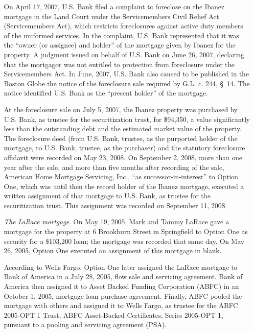 On April 17, 2007, U.S. Bank filed a complaint to foreclose on the Ibanez
mortgage in the Land Court under the Servicemembers Civil Relief Act
(Servicemembers Act), which restricts foreclosures against active duty members
of the uniformed services. In the complaint, U.S. Bank represented that it was
the ``owner (or assignee) and holder'' of the mortgage given by Ibanez for the
property. A judgment issued on behalf of U.S. Bank on June 26, 2007, declaring
that the mortgagor was not entitled to protection from foreclosure under the
Servicemembers Act. In June, 2007, U.S. Bank also caused to be published in the
Boston Globe the notice of the foreclosure sale required by G.L. c. 244, \S~14.
The notice identified U.S. Bank as the ``present holder'' of the mortgage.

At the foreclosure sale on July 5, 2007, the Ibanez property was purchased by
U.S. Bank, as trustee for the securitization trust, for \$94,350, a value
significantly less than the outstanding debt and the estimated market value of
the property. The foreclosure deed (from U.S. Bank, trustee, as the purported
holder of the mortgage, to U.S. Bank, trustee, as the purchaser) and the
statutory foreclosure affidavit were recorded on May 23, 2008. On September 2,
2008, more than one year after the sale, and more than five months after
recording of the sale, American Home Mortgage Servicing, Inc., ``as
successor-in-interest'' to Option One, which was until then the record holder
of the Ibanez mortgage, executed a written assignment of that mortgage to U.S.
Bank, as trustee for the securitization trust. This assignment was recorded on
September 11, 2008.

\textit{The LaRace mortgage}. On May 19, 2005, Mark and Tammy LaRace gave a
mortgage for the property at 6 Brookburn Street in Springfield to Option One as
security for a \$103,200 loan; the mortgage was recorded that same day. On May
26, 2005, Option One executed an assignment of this mortgage in blank.

According to Wells Fargo, Option One later assigned the LaRace mortgage to Bank
of America in a July 28, 2005, flow sale and servicing agreement. Bank of
America then assigned it to Asset Backed Funding Corporation (ABFC) in an
October 1, 2005, mortgage loan purchase agreement. Finally, ABFC pooled the
mortgage with others and assigned it to Wells Fargo, as trustee for the ABFC
2005-OPT 1 Trust, ABFC Asset-Backed Certificates, Series 2005-OPT 1, pursuant
to a pooling and servicing agreement (PSA).

